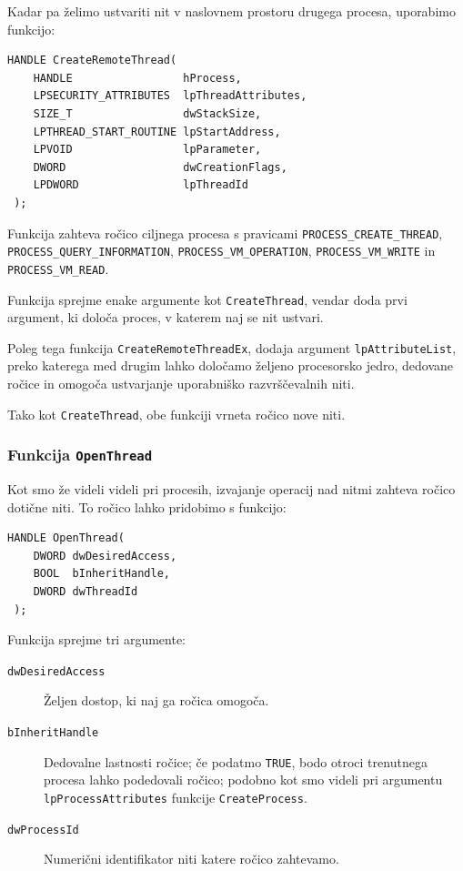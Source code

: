 \documentclass[a4paper,12pt,openright]{book}
\begin{document}
Kadar pa želimo ustvariti nit v naslovnem prostoru drugega procesa, uporabimo funkcijo:
\begin{lstlisting}[style=func]
 HANDLE CreateRemoteThread(
	HANDLE                 hProcess,
	LPSECURITY_ATTRIBUTES  lpThreadAttributes,
	SIZE_T                 dwStackSize,
	LPTHREAD_START_ROUTINE lpStartAddress,
	LPVOID                 lpParameter,
	DWORD                  dwCreationFlags,
	LPDWORD                lpThreadId
 );
\end{lstlisting}

Funkcija zahteva ročico ciljnega procesa s pravicami \texttt{PROCESS\_CREATE\-\_THREAD}, \texttt{PROCESS\_QUERY\_INFORMATION}, \texttt{PROCESS\_VM\-\_OPERATION}, \texttt{PROCESS\-\_VM\_WRITE} in \texttt{PROCESS\_VM\_READ}.

Funkcija sprejme enake argumente kot \texttt{CreateThread}, vendar doda prvi argument, ki določa proces, v katerem naj se nit ustvari.

Poleg tega funkcija \texttt{CreateRemoteThreadEx}, dodaja argument \texttt{lpAttributeList}, preko katerega med drugim lahko določamo željeno procesorsko jedro, dedovane ročice in omogoča ustvarjanje uporabniško razvrščevalnih niti.

Tako kot \texttt{CreateThread}, obe funkciji vrneta ročico nove niti.

\subsubsection{Funkcija \texttt{OpenThread}}

Kot smo že videli videli pri procesih, izvajanje operacij nad nitmi zahteva ročico dotične niti.
To ročico lahko pridobimo s funkcijo:
\begin{lstlisting}[style=func]
 HANDLE OpenThread(
	DWORD dwDesiredAccess,
	BOOL  bInheritHandle,
	DWORD dwThreadId
 );
\end{lstlisting}

Funkcija sprejme tri argumente:
\begin{description}
	\item[\texttt{dwDesiredAccess}] Željen dostop, ki naj ga ročica omogoča.
	\item[\texttt{bInheritHandle}] Dedovalne lastnosti ročice; če podatmo \texttt{TRUE}, bodo otroci trenutnega procesa lahko podedovali ročico; podobno kot smo videli pri argumentu \texttt{lpProcessAttributes} funkcije \texttt{CreateProcess}.
	\item[\texttt{dwProcessId}] Numerični identifikator niti katere ročico zahtevamo.
\end{description}
\end{document}
